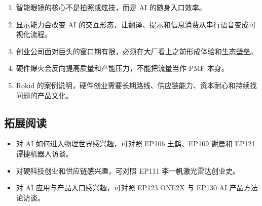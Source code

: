 \documentclass[a4paper]{article}
\begin{document}
\begin{enumerate}
\item 智能眼镜的核心不是拍照或炫技，而是 AI 的随身入口效率。
\item 显示能力会改变 AI 的交互形态，让翻译、提示和信息消费从串行语音变成可视化流程。
\item 创业公司面对巨头的窗口期有限，必须在大厂看上之前形成体验和生态壁垒。
\item 硬件爆火会反向提高质量和产能压力，不能把流量当作 PMF 本身。
\item Rokid 的案例说明，硬件创业需要长期路线、供应链能力、资本耐心和持续找问题的产品文化。
\end{enumerate}

\subsection{拓展阅读}

\begin{itemize}
\item 对 AI 如何进入物理世界感兴趣，可对照 EP106 王鹤、EP109 谢晨和 EP121 谭捷机器人访谈。
\item 对硬科技创业和供应链感兴趣，可对照 EP111 李一帆激光雷达创业史。
\item 对 AI 应用与产品入口感兴趣，可对照 EP123 ONE2X 与 EP130 AI 产品方法论访谈。
\end{itemize}
\end{document}

